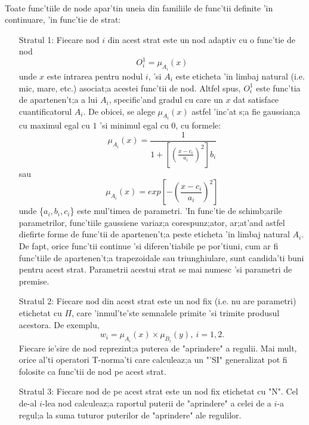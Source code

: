 \paragraph{}
Toate func'tiile de node apar'tin uneia din familiile de func'tii definite 'in continuare, 'in func'tie de strat:
\begin{enumerate}
\item [Stratul 1:] Fiecare nod $i$ din acest strat este un nod adaptiv cu o func'tie de nod 
\begin {equation}
O_{i}^{1} = \mu_{A_{i}}(x)
\end{equation}
unde $x$ este intrarea pentru nodul $i$, 'si $A_{i}$ este eticheta 'in limbaj natural (i.e. mic, mare, etc.) asociat;a acestei func'tii de nod. Altfel spus, $O_{i}^{1}$ este func'tia de apartenen't;a a lui $A_{i}$, specific'and gradul cu care un $x$ dat satisface cuantificatorul $A_{i}$. De obicei, se alege $\mu_{A_{i}}(x)$ astfel 'inc'at s;a fie gaussian;a cu maximul egal cu $1$ 'si minimul egal cu $0$, cu formele:
\begin{equation}
\mu_{A_{i}}(x) = \frac {1} {1 + [(\frac {x - c_{i}} {a_{i}})^2]b_{i}}
\end{equation}
sau
\begin{equation}
\mu_{A_{i}}(x) = exp[- (\frac {x-c_{i}} {a_{i}} )^{2}]
\end{equation}
unde \{$a_{i}, b_{i}, c_{i}$\} este mul'timea de parametri. 'In func'tie de schimb;arile parametrilor, func'tiile gaussiene variaz;a corespunz;ator, ar;at'and astfel diefirte forme de func'tii de apartenen't;a peste eticheta 'in limbaj natural $A_{i}$. De fapt, orice func'tii continue 'si diferen'tiabile pe por'tiuni, cum ar fi func'tiile de apartenen't;a trapezoidale sau triunghiulare, sunt candida'ti buni pentru acest strat. Parametrii acestui strat se mai numesc 'si parametri de premise.
\item [Stratul 2:] Fiecare nod din acest strat este un nod fix (i.e. nu are parametri) etichetat cu $\Pi$, care 'inmul'te'ste semnalele primite 'si trimite produsul acestora. De exemplu,
\begin{equation}
w_{i} = \mu_{A_{i}}(x) \times \mu_{B_{i}}(y),\ i = 1,2.
\end{equation}
Fiecare ie'sire de nod reprezint;a puterea de "aprindere" a regulii. Mai mult, orice al'ti operatori T-norma'ti care calculeaz;a un "'SI" generalizat pot fi folosite ca func'tii de nod pe acest strat.
\item [Stratul 3:] Fiecare nod de pe acest strat este un nod fix etichetat cu "N". Cel de-al $i$-lea nod calculeaz;a raportul puterii de "aprindere" a celei de a $i$-a regul;a la suma tuturor puterilor de "aprindere" ale regulilor.

\end{enumerate}
